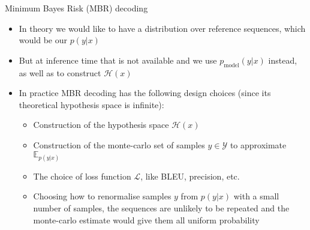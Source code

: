 \begin{vbframe}{Minimum Bayes Risk (MBR) decoding}


\vfill

\begin{itemize}
    \item In theory we would like to have a distribution over reference sequences, which would be our $p(y|x)$
    \item But at inference time that is not available and we use $p_{\text{model}}(y|x)$ instead, as well as to construct $\mathcal{H}(x)$
    \item In practice MBR decoding has the following design choices (since its theoretical hypothesis space is infinite):
    \begin{itemize}
        \item Construction of the hypothesis space $\mathcal{H}(x)$
        \item Construction of the monte-carlo set of samples $y \in \mathcal{Y}$ to approximate $\mathbb{E}_{p(y|x)}$
        \item The choice of loss function $\mathcal{L}$, like BLEU, precision, etc. 
        \item Choosing how to renormalise samples $y$ from $p(y|x)$ with a small number of samples, the sequences are unlikely to be repeated and the monte-carlo estimate would give them all uniform probability
    \end{itemize}
\end{itemize}

\vfill

\end{vbframe}


\endlecture
